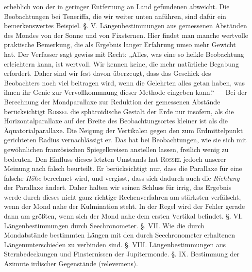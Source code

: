erheblich von der in geringer Entfernung an Land gefundenen abweicht. Die Beobachtungen bei Teneriffa, die wir weiter unten anführen, sind dafür ein bemerkenswertes Beispiel. §. V. Längenbestimmungen aus gemessenen Abständen des Mondes von der Sonne und von Fixsternen. Hier findet man manche wertvolle praktische Bemerkung, die als Ergebnis langer Erfahrung umso mehr Gewicht hat. Der Verfasser sagt gewiss mit Recht: „Alles, was eine so heikle Beobachtung erleichtern kann, ist wertvoll. Wir kennen keine, die mehr natürliche Begabung erfordert. Daher sind wir fest davon überzeugt, dass das Geschick des Beobachters noch viel beitragen wird, wenn die Gelehrten alles getan haben, was ihnen ihr Genie zur Vervollkommnung dieser Methode eingeben kann.“ — Bei der Berechnung der Mondparallaxe zur Reduktion der gemessenen Abstände berücksichtigt \textsc{Rossel} die sphäroidische Gestalt der Erde nur insofern, als die Horizontalparallaxe auf der Breite des Beobachtungsortes kleiner ist als die Äquatorialparallaxe. Die Neigung der Vertikalen gegen den zum Erdmittelpunkt gerichteten Radius vernachlässigt er. Das hat bei Beobachtungen, wie sie sich mit gewöhnlichen französischen Spiegelkreisen anstellen lassen, freilich wenig zu bedeuten. Den Einfluss dieses letzten Umstands hat \textsc{Rossel} jedoch unserer Meinung nach falsch beurteilt. Er berücksichtigt nur, dass die Parallaxe für eine falsche \emph{Höhe} berechnet wird, und vergisst, dass sich dadurch auch die \emph{Richtung} der Parallaxe ändert. Daher halten wir seinen Schluss für irrig, das Ergebnis werde durch dieses nicht ganz richtige Rechenverfahren am stärksten verfälscht, wenn der Mond nahe der Kulmination steht. In der Regel wird der Fehler gerade dann am größten, wenn sich der Mond nahe dem ersten Vertikal befindet. §. VI. Längenbestimmungen durch Seechronometer. §. VII. Wie die durch Mondabstände bestimmten Längen mit den durch Seechronometer erhaltenen Längenunterschieden zu verbinden sind. §. VIII. Längenbestimmungen aus Sternbedeckungen und Finsternissen der Jupitermonde. §. IX. Bestimmung der Azimute irdischer Gegenstände (relevemens).

